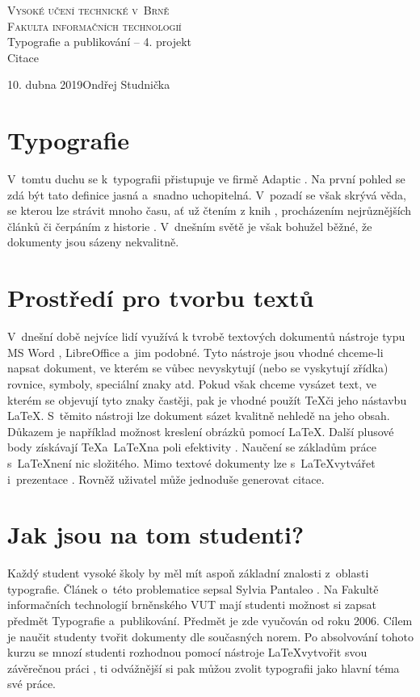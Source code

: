\documentclass[a4paper,11pt]{article}
\begin{document}
\begin{titlepage}
\begin{center}
\Huge
\textsc{Vysoké učení technické v~Brně}\\ \huge \textsc{Fakulta informačních technologií\\}
\LARGE
Typografie a publikování -- 4. projekt \\
\Huge
Citace
\end{center} 
{\Large 10. dubna 2019\hfill Ondřej Studnička}
\end{titlepage}

\section{Typografie}
{\em {}} V~tomtu duchu se k~typografii přistupuje ve firmě Adaptic \cite{elektronicky1}. Na první pohled se zdá být tato definice jasná a~snadno uchopitelná. V~pozadí se však skrývá věda, se kterou lze strávit mnoho času, ať už čtením z knih \cite{kniha1}, procházením nejrůznějších článků či čerpáním z historie \cite{clanek1}. V~dnešním světě je však bohužel běžné, že dokumenty jsou sázeny nekvalitně.

\section{Prostředí pro tvorbu textů}
V~dnešní době nejvíce lidí využívá k tvrobě textových dokumentů nástroje typu MS Word \cite{kniha2}, LibreOffice a~jim podobné. Tyto nástroje jsou vhodné chceme-li napsat dokument, ve kterém se vůbec nevyskytují (nebo se vyskytují zřídka) rovnice, symboly, speciální znaky atd. Pokud však chceme vysázet text, ve kterém se objevují tyto znaky častěji, pak je vhodné použít \TeX\space  či jeho nástavbu \LaTeX. S~těmito nástroji lze dokument sázet kvalitně nehledě na jeho obsah. Důkazem je například možnost kreslení obrázků pomocí \LaTeX\space \cite{serial}. Další plusové body získávají \TeX\space a~\LaTeX\space na poli efektivity \cite{elektronicky2}. Naučení se základům práce s~\LaTeX\space není nic složitého. Mimo textové dokumenty lze s~\LaTeX\space vytvářet i~prezentace \cite{elektronicky3}. Rovněž uživatel může jednoduše generovat citace. 

\section{Jak jsou na tom studenti?}
Každý student vysoké školy by měl mít aspoň základní znalosti z~oblasti typografie. Článek o~této problematice sepsal Sylvia Pantaleo \cite{clanek2}. Na Fakultě informačních technologií brněnského VUT mají studenti možnost si zapsat předmět Typografie a~publikování. Předmět je zde vyučován od roku 2006. Cílem je naučit studenty tvořit dokumenty dle současných norem. Po absolvování tohoto kurzu se mnozí studenti rozhodnou pomocí nástroje \LaTeX\space vytvořit svou závěrečnou práci \cite{bakalar1}, ti odvážnější si pak můžou zvolit typografii jako hlavní téma své práce\cite{bakalar2}.


\newpage
\renewcommand{\refname}{Literatura}


\end{document}
